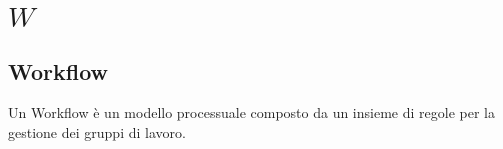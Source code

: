 \section{\quad$W\quad$}
\subsection{Workflow}
Un Workflow è un modello processuale composto da un insieme di regole per la gestione dei gruppi di lavoro.